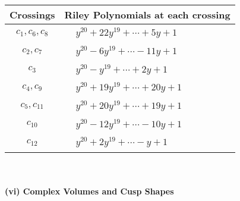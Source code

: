 \documentclass[1p]{elsarticle_modified}
\theoremstyle{definition}
\begin{document}
\begin{tabular}{m{50pt}|m{274pt}}
Crossings & \hspace{64pt}Riley Polynomials at each crossing \\
\hline $$\begin{aligned}c_{1},c_{6},c_{8}\end{aligned}$$&$\begin{aligned}
&y^{20}+22 y^{19}+\cdots+5 y+1
\end{aligned}$\\
\hline $$\begin{aligned}c_{2},c_{7}\end{aligned}$$&$\begin{aligned}
&y^{20}-6 y^{19}+\cdots-11 y+1
\end{aligned}$\\
\hline $$\begin{aligned}c_{3}\end{aligned}$$&$\begin{aligned}
&y^{20}- y^{19}+\cdots+2 y+1
\end{aligned}$\\
\hline $$\begin{aligned}c_{4},c_{9}\end{aligned}$$&$\begin{aligned}
&y^{20}+19 y^{19}+\cdots+20 y+1
\end{aligned}$\\
\hline $$\begin{aligned}c_{5},c_{11}\end{aligned}$$&$\begin{aligned}
&y^{20}+20 y^{19}+\cdots+19 y+1
\end{aligned}$\\
\hline $$\begin{aligned}c_{10}\end{aligned}$$&$\begin{aligned}
&y^{20}-12 y^{19}+\cdots-10 y+1
\end{aligned}$\\
\hline $$\begin{aligned}c_{12}\end{aligned}$$&$\begin{aligned}
&y^{20}+2 y^{19}+\cdots- y+1
\end{aligned}$\\
\hline
\end{tabular}\\~\\
\newpage\flushleft \textbf{(vi) Complex Volumes and Cusp Shapes}
\end{document}
